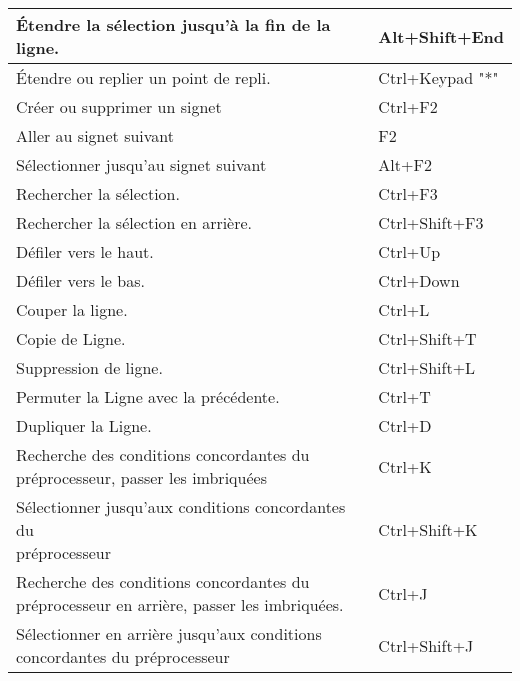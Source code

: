 {\begin{longtable}{|l|l|}
Étendre la sélection jusqu'à la fin de la ligne.&   Alt+Shift+End               \\ \hline
Étendre ou replier un point de repli. 	        &   Ctrl+Keypad "*"             \\ \hline
Créer ou supprimer un signet	                &	Ctrl+F2                     \\ \hline
Aller au signet suivant		                    &	F2                          \\ \hline
Sélectionner jusqu'au signet suivant            &	Alt+F2                      \\ \hline
Rechercher la sélection.			            & 	Ctrl+F3                     \\ \hline
Rechercher la sélection en arrière.             &	Ctrl+Shift+F3               \\ \hline
Défiler vers le haut. 	                        &   Ctrl+Up                     \\ \hline
Défiler vers le bas. 	                        &   Ctrl+Down                   \\ \hline
Couper la ligne. 	                            &   Ctrl+L                      \\ \hline
Copie de Ligne. 	                            &   Ctrl+Shift+T                \\ \hline
Suppression de ligne. 	                        &   Ctrl+Shift+L                \\ \hline
Permuter la Ligne avec la précédente. 	        &   Ctrl+T                      \\ \hline
Dupliquer la Ligne. 	                        &   Ctrl+D                      \\ \hline
\makecell[l]{Recherche des conditions concordantes du \\
préprocesseur, passer les imbriquées} 	        &   Ctrl+K                      \\ \hline
\makecell[l]{Sélectionner jusqu'aux conditions concordantes du \\
préprocesseur} 	                                &   Ctrl+Shift+K                \\ \hline
\makecell[l]{Recherche des conditions concordantes du \\
préprocesseur en arrière, passer les imbriquées.} 	    &   Ctrl+J              \\ \hline
\makecell[l]{Sélectionner en arrière jusqu'aux conditions \\
concordantes du préprocesseur}	                &   Ctrl+Shift+J                \\ \hline

\end{longtable}}
